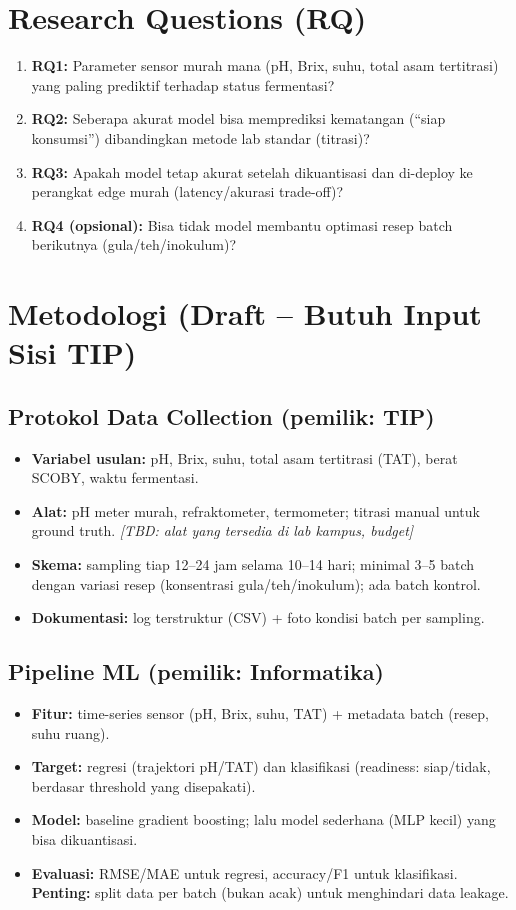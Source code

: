 \documentclass[conference]{IEEEtran}
\begin{document}
\section{Research Questions (RQ)}
\begin{enumerate}
    \item \textbf{RQ1:} Parameter sensor murah mana (pH, Brix, suhu, total asam tertitrasi) yang paling prediktif terhadap status fermentasi?
    \item \textbf{RQ2:} Seberapa akurat model bisa memprediksi kematangan (``siap konsumsi'') dibandingkan metode lab standar (titrasi)?
    \item \textbf{RQ3:} Apakah model tetap akurat setelah dikuantisasi dan di-deploy ke perangkat edge murah (latency/akurasi trade-off)?
    \item \textbf{RQ4 (opsional):} Bisa tidak model membantu optimasi resep batch berikutnya (gula/teh/inokulum)?
\end{enumerate}

\section{Metodologi (Draft -- Butuh Input Sisi TIP)}
\subsection{Protokol Data Collection (pemilik: TIP)}
\begin{itemize}
    \item \textbf{Variabel usulan:} pH, Brix, suhu, total asam tertitrasi (TAT), berat SCOBY, waktu fermentasi.
    \item \textbf{Alat:} pH meter murah, refraktometer, termometer; titrasi manual untuk ground truth. \emph{[TBD: alat yang tersedia di lab kampus, budget]}
    \item \textbf{Skema:} sampling tiap 12--24 jam selama 10--14 hari; minimal 3--5 batch dengan variasi resep (konsentrasi gula/teh/inokulum); ada batch kontrol.
    \item \textbf{Dokumentasi:} log terstruktur (CSV) + foto kondisi batch per sampling.
\end{itemize}

\subsection{Pipeline ML (pemilik: Informatika)}
\begin{itemize}
    \item \textbf{Fitur:} time-series sensor (pH, Brix, suhu, TAT) + metadata batch (resep, suhu ruang).
    \item \textbf{Target:} regresi (trajektori pH/TAT) dan klasifikasi (readiness: siap/tidak, berdasar threshold yang disepakati).
    \item \textbf{Model:} baseline gradient boosting; lalu model sederhana (MLP kecil) yang bisa dikuantisasi.
    \item \textbf{Evaluasi:} RMSE/MAE untuk regresi, accuracy/F1 untuk klasifikasi. \textbf{Penting:} split data per batch (bukan acak) untuk menghindari data leakage.
\end{itemize}
\end{document}
